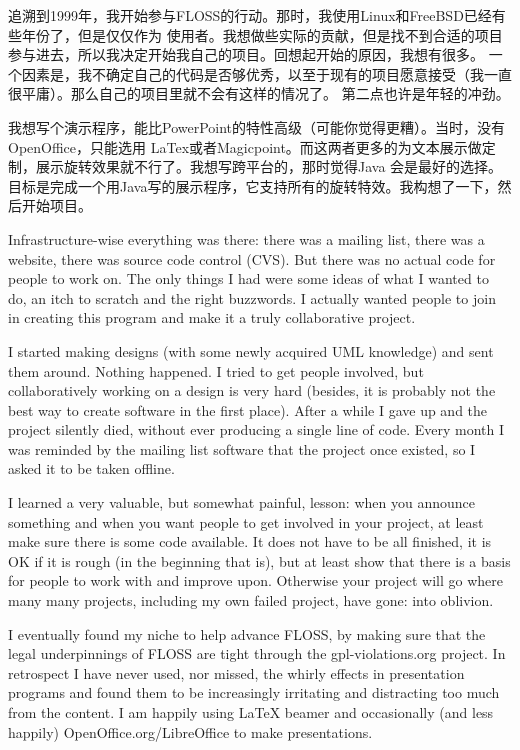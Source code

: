 

\noindent{}追溯到1999年，我开始参与FLOSS的行动。那时，我使用Linux和FreeBSD已经有些年份了，但是仅仅作为
使用者。我想做些实际的贡献，但是找不到合适的项目参与进去，所以我决定开始我自己的项目。回想起开始的原因，我想有很多。
一个因素是，我不确定自己的代码是否够优秀，以至于现有的项目愿意接受（我一直很平庸）。那么自己的项目里就不会有这样的情况了。
第二点也许是年轻的冲劲。

我想写个演示程序，能比PowerPoint的特性高级（可能你觉得更糟）。当时，没有OpenOffice，只能选用
LaTex或者Magicpoint。而这两者更多的为文本展示做定制，展示旋转效果就不行了。我想写跨平台的，那时觉得Java
会是最好的选择。目标是完成一个用Java写的展示程序，它支持所有的旋转特效。我构想了一下，然后开始项目。

Infrastructure-wise everything was there: there was a mailing list, there was a
website, there was source code control (CVS). But there was no actual code for
people to work on. The only things I had were some ideas of what I wanted to do,
an itch to scratch and the right buzzwords. I actually wanted people to join in
creating this program and make it a truly collaborative project.

I started making designs (with some newly acquired UML knowledge) and sent them
around. Nothing happened. I tried to get people involved, but collaboratively
working on a design is very hard (besides, it is probably not the best way to
create software in the first place). After a while I gave up and the project
silently died, without ever producing a single line of code. Every month I was
reminded by the mailing list software that the project once existed, so I asked
it to be taken offline.

I learned a very valuable, but somewhat painful, lesson: when you announce
something and when you want people to get involved in your project, at least
make sure there is some code available. It does not have to be all finished, it
is OK if it is rough (in the beginning that is), but at least show that there is
a basis for people to work with and improve upon. Otherwise your project will go
where many many projects, including my own failed project, have gone: into
oblivion.

I eventually found my niche to help advance FLOSS, by making sure that the legal
underpinnings of FLOSS are tight through the gpl-violations.org project. In
retrospect I have never used, nor missed, the whirly effects in presentation
programs and found them to be increasingly irritating and distracting too much
from the content. I am happily using LaTeX beamer and occasionally (and less
happily) OpenOffice.org/LibreOffice to make presentations.
